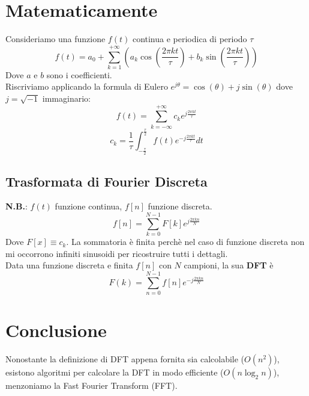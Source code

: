 \documentclass[12pt, a4paper]{report}
\begin{document}
\section{Matematicamente}
Consideriamo una funzione $f(t)$ continua e periodica di periodo $\tau$
\begin{equation*}
    f(t) = a_{0} + \sum_{k=1}^{+\infty} \left(a_{k} \cos\left(\frac{2\pi k t}{\tau}\right) + b_{k} \sin\left(\frac{2\pi k t}{\tau}\right)\right)
\end{equation*}
Dove $a$ e $b$ sono i coefficienti.\\
Riscriviamo applicando la formula di Eulero $e^{j\theta} = \cos(\theta) + j\sin(\theta)$ dove $j = \sqrt{-1}$ immaginario:
\begin{equation*}
    f(t) = \sum_{k=-\infty}^{+\infty} c_{k} e^{j\frac{2\pi k t}{\tau}}
\end{equation*}
\begin{equation*}
    c_{k} = \frac{1}{\tau} \int_{-\frac{\tau}{2}}^{\frac{\tau}{2}} f(t) e^{-j\frac{2\pi k t}{\tau}} dt
\end{equation*}
\subsection{Trasformata di Fourier Discreta}
\textbf{N.B.}: $f(t)$ funzione continua, $f[n]$ funzione discreta.
\begin{equation*}
    f[n] = \sum_{k=0}^{N-1} F[k] e^{j\frac{2\pi k n}{N}}
\end{equation*}
Dove $F[x]\equiv c_{k}$. La sommatoria è finita perchè nel caso di funzione discreta non mi occorrono infiniti sinusoidi per ricostruire tutti i dettagli.\\
Data una funzione discreta e finita $f[n]$ con $N$ campioni, la sua \textbf{DFT} è
\begin{equation*}
    F(k) = \sum_{n=0}^{N-1} f[n] e^{-j\frac{2\pi k n}{N}}
\end{equation*}
\section{Conclusione}
Nonostante la definizione di DFT appena fornita sia calcolabile ($O(n^{2})$), esistono algoritmi per calcolare la DFT in modo efficiente ($O(n\log_{2}n)$), menzoniamo la Fast Fourier Transform (FFT).
\end{document}
